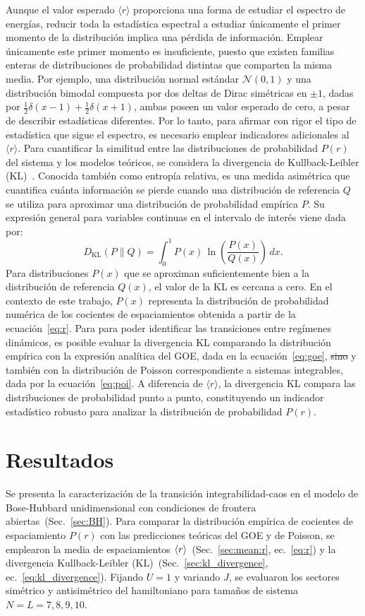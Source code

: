 \documentclass[10pt,a4paper]{article}
\begin{document}
 Aunque el valor esperado $\langle r \rangle$ proporciona una forma de estudiar el espectro de energías, reducir toda la estadística espectral a estudiar únicamente el primer momento de la distribución implica una pérdida de información. Emplear únicamente este primer momento es insuficiente, puesto que existen familias enteras de distribuciones de probabilidad distintas que comparten la misma media. Por ejemplo, una distribución normal estándar $\mathcal{N}(0, 1)$ y una distribución bimodal compuesta por dos deltas de Dirac simétricas en $\pm 1$, dadas por $\frac{1}{2}\delta(x-1) + \frac{1}{2}\delta(x+1)$, ambas poseen un valor esperado de cero, a pesar de describir estadísticas diferentes. Por lo tanto, para afirmar con rigor el tipo de estadística que sigue el espectro, es necesario emplear indicadores adicionales al $\langle r \rangle$. Para cuantificar la similitud entre las distribuciones de probabilidad $P(r)$ del sistema y los modelos teóricos, se considera la divergencia de Kullback-Leibler (KL)~\cite{kullback1951information}. Conocida también como entropía relativa, es una medida asimétrica que cuantifica cuánta información se pierde cuando una distribución de referencia $Q$ se utiliza para aproximar una distribución de probabilidad empírica $P$. Su expresión general para variables continuas en el intervalo de interés viene dada por:
\begin{equation}
  D_{\text{KL}}(P \parallel Q) = \int_{0}^{1} P(x) \, \ln \left( \frac{P(x)}{Q(x)} \right) \, dx.
\label{eq:kl_divergence}
\end{equation}
Para distribuciones $P(x)$ que se aproximan suficientemente bien a la distribución de referencia $Q(x)$, el valor de la KL es cercana a cero. En el contexto de este trabajo, $P(x)$ representa la distribución de probabilidad numérica de los cocientes de espaciamientos obtenida a partir de la ecuación~\eqref{eq:r}. Para para poder identificar las transiciones entre regímenes dinámicos, es posible evaluar la divergencia KL comparando la distribución empírica con la expresión analítica del GOE, dada en la ecuación~\eqref{eq:goe}, \sout{sino} y también con la distribución de Poisson correspondiente a sistemas integrables, dada por la ecuación~\eqref{eq:poi}. A diferencia de $\langle r \rangle$, 
la divergencia KL compara las distribuciones de probabilidad punto a punto, constituyendo un indicador estadístico robusto para analizar la distribución de probabilidad $P(r)$.

\section{Resultados}
Se presenta la caracterización de la transición integrabilidad-caos en el modelo de Bose-Hubbard unidimensional con condiciones de frontera abiertas~(Sec.~\ref{sec:BH}). 
Para comparar la distribución empírica de cocientes de espaciamiento $P(r)$ con las predicciones teóricas del GOE y de Poisson, se emplearon la media de espaciamientos $\ev{r}$~(Sec.~\ref{sec:mean:r}, ec.~\eqref{eq:r}) y la divergencia Kullback-Leibler (KL)~(Sec.~\ref{sec:kl_divergence}, ec.~\eqref{eq:kl_divergence}).
Fijando $U=1$ y variando $J$, se evaluaron los sectores simétrico y antisimétrico del hamiltoniano para tamaños de sistema $N=L=7, 8, 9, 10$.
\end{document}
